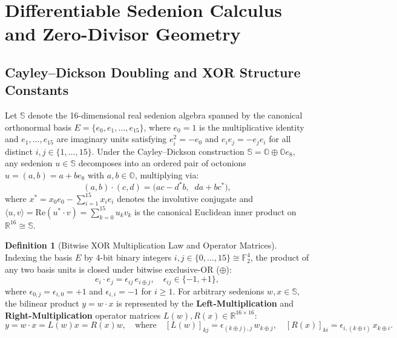 \documentclass[11pt,a4paper]{article}
\theoremstyle{definition}
\newtheorem{definition}[theorem]{Definition}
\theoremstyle{remark}
\newcommand{\R}{\mathbb{R}}
\newcommand{\Oc}{\mathbb{O}}
\newcommand{\Se}{\mathbb{S}}
\newcommand{\Ftwo}{\mathbb{F}_2}
\newcommand{\RePart}{\mathrm{Re}}
\begin{document}
\section{Differentiable Sedenion Calculus and Zero-Divisor Geometry}
\label{sec:wp1}

\subsection{Cayley--Dickson Doubling and XOR Structure Constants}
Let $\Se$ denote the 16-dimensional real sedenion algebra spanned by the canonical orthonormal basis $E = \{e_0, e_1, \dots, e_{15}\}$, where $e_0 = 1$ is the multiplicative identity and $e_1, \dots, e_{15}$ are imaginary units satisfying $e_i^2 = -e_0$ and $e_i e_j = -e_j e_i$ for all distinct $i, j \in \{1, \dots, 15\}$. Under the Cayley--Dickson construction $\Se = \Oc \oplus \Oc e_8$, any sedenion $u \in \Se$ decomposes into an ordered pair of octonions $u = (a, b) = a + b e_8$ with $a, b \in \Oc$, multiplying via:
\begin{equation}
\label{eq:cd_doubling}
(a, b) \cdot (c, d) = \big(a c - d^* b, \;\; d a + b c^*\big),
\end{equation}
where $x^* = x_0 e_0 - \sum_{i=1}^{15} x_i e_i$ denotes the involutive conjugate and $\langle u, v \rangle = \RePart(u^* \cdot v) = \sum_{k=0}^{15} u_k v_k$ is the canonical Euclidean inner product on $\R^{16} \cong \Se$.

\begin{definition}[Bitwise XOR Multiplication Law and Operator Matrices]
\label{def:xor_mult}
Indexing the basis $E$ by 4-bit binary integers $i, j \in \{0, \dots, 15\} \cong \Ftwo^4$, the product of any two basis units is closed under bitwise exclusive-OR ($\oplus$):
\begin{equation}
\label{eq:basis_xor}
e_i \cdot e_j = \epsilon_{ij} \, e_{i \oplus j}, \quad \epsilon_{ij} \in \{-1, +1\},
\end{equation}
where $\epsilon_{0,j} = \epsilon_{i,0} = +1$ and $\epsilon_{i,i} = -1$ for $i \ge 1$. For arbitrary sedenions $w, x \in \Se$, the bilinear product $y = w \cdot x$ is represented by the \textbf{Left-Multiplication} and \textbf{Right-Multiplication} operator matrices $L(w), R(x) \in \R^{16 \times 16}$:
\begin{equation}
\label{eq:lr_operators}
y = w \cdot x = L(w)x = R(x)w, \quad \text{where} \quad [L(w)]_{kj} = \epsilon_{(k \oplus j), j} \, w_{k \oplus j}, \quad [R(x)]_{ki} = \epsilon_{i, (k \oplus i)} \, x_{k \oplus i}.
\end{equation}
\end{definition}
\end{document}
